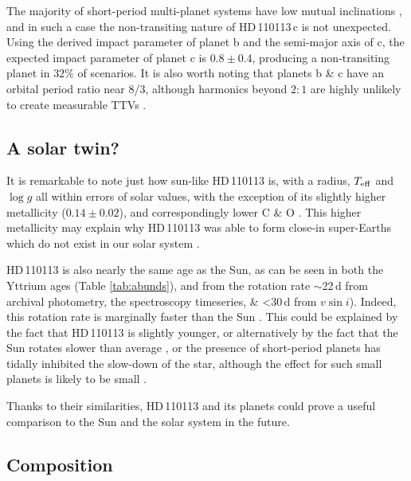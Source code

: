 \documentclass[fleqn,usenatbib]{mnras}
\newcommand{\vsini}{$v\sin{i}$}
\newcommand{\teff}{$T_{\rm eff}$}
\newcommand{\logg}{$\log g$}
\newcommand{\Tstar}{HD\,110113}
\newcommand{\Tplanetc}{HD\,110113\,c}
\begin{document}
The majority of short-period multi-planet systems have low mutual inclinations \citep{lissauer2011architecture}, and in such a case the non-transiting nature of \Tplanetc{} is not unexpected.
Using the derived impact parameter of planet b and the semi-major axis of c, the expected impact parameter of planet c is $0.8\pm0.4$, producing a non-transiting planet in $32\%$ of scenarios.
It is also worth noting that planets b \& c have an orbital period ratio near 8/3, although harmonics beyond $2:1$ are highly unlikely to create measurable TTVs \citep{deck2015measurement}.

\subsection{A solar twin?}
It is remarkable to note just how sun-like \Tstar{} is, with a radius, \teff{} and \logg{} all within errors of solar values, with the exception of its slightly higher metallicity ($0.14\pm0.02$), and correspondingly lower C \& O \citep[e.g.][]{Franchini2020,2015A&A...576A..89B}.
This higher metallicity may explain why \Tstar{} was able to form close-in super-Earths which do not exist in our solar system \citep{mulders2016super,bitsch2020influence}.

\Tstar{} is also nearly the same age as the Sun, as can be seen in both the Yttrium ages (Table \ref{tab:abunds}), and from the rotation rate $\sim$22\,d from archival photometry, the spectroscopy timeseries, \& <30\,d from \vsini{}).
Indeed, this rotation rate is marginally faster than the Sun \citep[25-26.5d when measured with HARPS-N and converted to sidereal period,][]{milbourne2019harps}.
This could be explained by the fact that \Tstar{} is slightly younger, or alternatively by the fact that the Sun rotates slower than average \citep{2008ApJ...684..691R}, or the presence of short-period planets has tidally inhibited the slow-down of the star, although the effect for such small planets is likely to be small \citep{bolmont2012effect}.

Thanks to their similarities, \Tstar{} and its planets could prove a useful comparison to the Sun and the solar system in the future.

\subsection{Composition}\label{sect:internal}
\end{document}
